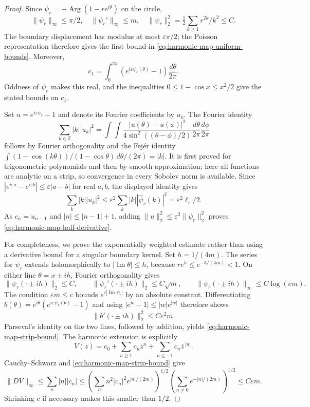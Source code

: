 \documentclass[11pt,a4paper]{article}
\numberwithin{equation}{section}
\theoremstyle{definition}
\theoremstyle{remark}
\begin{document}
\begin{proof}
Since $\psi_r=-\operatorname{Arg}(1-re^{i\theta})$ on the circle,
\[
 \|\psi_r\|_\infty\leq\pi/2,
 \quad \|\psi_r'\|_\infty\leq m,
 \quad \|\psi_r\|_2^2=\tfrac12\sum_{k\geq1}r^{2k}/k^2\leq C.
\]
The boundary displacement has modulus at most $\varepsilon\pi/2$;
the Poisson representation therefore gives the first bound in
\eqref{eq:harmonic-map-uniform-bounds}. Moreover,
\[
 c_1=\int_0^{2\pi}(e^{i\varepsilon\psi_r(\theta)}-1)
                         \frac{d\theta}{2\pi}.
\]
Oddness of $\psi_r$ makes this real, and the inequalities
$0\leq1-\cos x\leq x^2/2$ give the stated bounds on $c_1$.

Set $u=e^{i\varepsilon\psi_r}-1$ and denote its Fourier coefficients
by $u_k$. The Fourier identity
\[
 \sum_{k\in\mathbb Z}|k||u_k|^2
 =\int\!\!\int
   \frac{|u(\theta)-u(\phi)|^2}{4\sin^2((\theta-\phi)/2)}
        \frac{d\theta}{2\pi}\frac{d\phi}{2\pi}
\]
follows by Fourier orthogonality and the Fej\'er identity
$\int(1-\cos(k\theta))/(1-\cos\theta)\,d\theta/(2\pi)=|k|$.
It is first proved for trigonometric polynomials and then by smooth
approximation; here all functions are analytic on a strip, so convergence
in every Sobolev norm is available. Since
$|e^{i\varepsilon a}-e^{i\varepsilon b}|\leq\varepsilon|a-b|$
for real $a,b$, the displayed identity gives
\[
 \sum_k|k||u_k|^2
 \leq\varepsilon^2\sum_k|k||\widehat\psi_r(k)|^2
 =\varepsilon^2\ell_r/2.
\]
As $c_n=u_{n-1}$ and $|n|\leq|n-1|+1$, adding
$\|u\|_2^2\leq\varepsilon^2\|\psi_r\|_2^2$ proves
\eqref{eq:harmonic-map-half-derivative}.

For completeness, we prove the exponentially weighted estimate rather
than using a derivative bound for a singular boundary kernel. Set
$h=1/(4m)$. The series for $\psi_r$ extends holomorphically to
$|\operatorname{Im}\theta|\leq h$, because
$re^h\leq e^{-3/(4m)}<1$. On either line $\theta=x\pm ih$, Fourier
orthogonality gives
\[
 \|\psi_r(\cdot\pm ih)\|_2\leq C,
 \qquad
 \|\psi_r'(\cdot\pm ih)\|_2\leq C\sqrt m,
 \qquad
 \|\psi_r(\cdot\pm ih)\|_\infty\leq C\log(em).
\]
The condition $\varepsilon m\leq c$ bounds
$e^{\varepsilon|\operatorname{Im}\psi_r|}$ by an absolute constant.
Differentiating
$b(\theta)=e^{i\theta}(e^{i\varepsilon\psi_r(\theta)}-1)$ and using
$|e^w-1|\leq|w|e^{|w|}$ therefore shows
\[
 \|b'(\cdot\pm ih)\|_2^2\leq C\varepsilon^2m.
\]
Parseval's identity on the two lines, followed by addition, yields
\eqref{eq:harmonic-map-strip-bound}.
The harmonic extension is explicitly
\[
 V(z)=c_0+\sum_{n\geq1}c_nz^n+\sum_{n\leq-1}c_n\overline z^{\,|n|}.
\]
Cauchy--Schwarz and \eqref{eq:harmonic-map-strip-bound} give
\[
 \|DV\|_\infty
 \leq\sum_n|n||c_n|
 \leq
 \left(\sum_n n^2|c_n|^2e^{|n|/(2m)}\right)^{1/2}
 \left(\sum_{n\ne0}e^{-|n|/(2m)}\right)^{1/2}
 \leq C\varepsilon m.
\]
Shrinking $c$ if necessary makes this smaller than $1/2$.


\end{proof}
\end{document}
